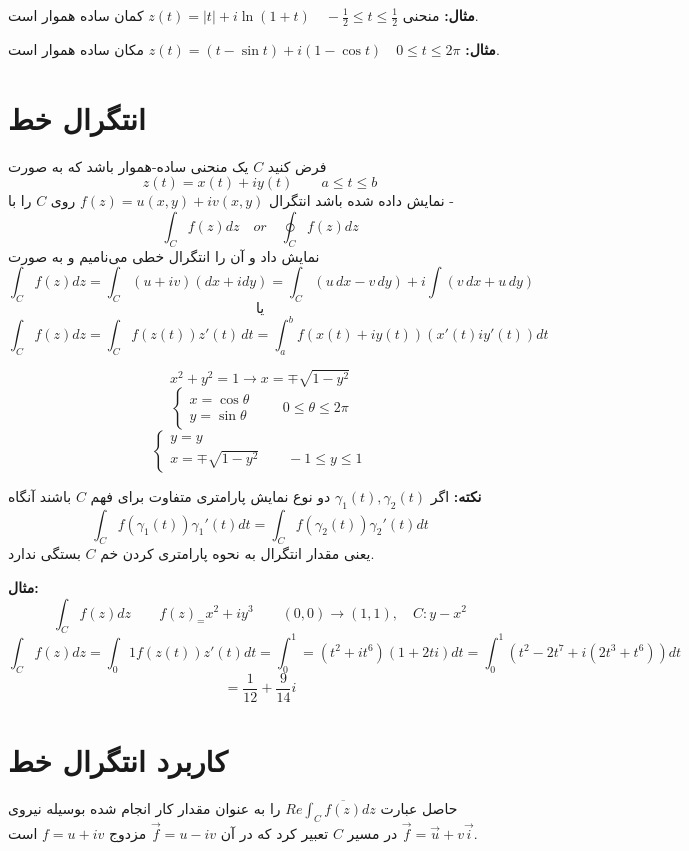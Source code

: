 \documentclass[12pt]{report}
\begin{document}
	 \textbf{مثال:}
	 منحنی
	 $z(t) = |t| + i \ln(1 + t) \quad  -\frac{1}{2} \leq t \leq \frac{1}{2}$
	 کمان ساده هموار است.
	 \newline
	 
	 \textbf{مثال:}
	 $z(t) = (t - \sin t) + i(1 - \cos t)\quad 0 \leq t \leq 2\pi$
	 مکان ساده هموار است.
	 \section{انتگرال خط}
	 فرض کنید 
	 $C$
	 یک منحنی ساده-هموار باشد که به صورت
	 $$z(t) = x(t) + i y(t) \qquad a \leq t \leq b$$
	 نمایش داده شده باشد انتگرال 
	 $f(z) = u(x, y) + i v(x, y)$
	 روی 
	 $C$
	 را با -
	 $$\int_{C} f(z) dz \quad or \quad \oint_{C} f(z) dz$$
	 نمایش داد و آن را انتگرال خطی می‌نامیم و به صورت 
	 $$\int_{C} f(z) dz = \int_{C} (u + iv)(dx + idy) = \int_{C}(u \, dx -v \, dy) + i\int (v \, dx + u \, dy)
	 $$
	 $$\text{یا}$$
	 $$\int_{C} f(z) dz = \int_{C} f(z(t)) z'(t) \, dt = \int_{a}^{b} f(x(t) + i y(t))(x'(t) i y'(t)) dt$$
	 
	 $$x^2 + y^2 = 1 \rightarrow x =\mp \sqrt{1 - y^2}$$
	 \[
	 \begin{cases}
	 	x = \cos \theta \\
	 	y = \sin \theta
	 \end{cases}
 \qquad 0 \leq \theta \leq 2\pi
	 \]
	 \[
	 \begin{cases}
	 	y = y \\
	 	x = \mp \sqrt{1 - y^2} \qquad -1 \leq y \leq 1
	 \end{cases}
	 \]
	 \newline
	 
	 \textbf{نکته:}
	 اگر 
	 $\gamma_1(t) , \gamma_2(t)$
	 دو نوع نمایش پارامتری متفاوت برای فهم 
	 $C$
	 باشند آنگاه
	 $$\int_{C} f(\gamma_1(t)) \gamma_1'(t) dt = \int_{C} f(\gamma_2(t)) \gamma_2'(t) dt$$ 
	 یعنی مقدار انتگرال به نحوه پارامتری کردن خم 
	 $C$
	 بستگی ندارد.
	 \newline
	 
	 \textbf{مثال:}
	 $$\int_{C} f(z) dz \qquad f(z)_ = x^2 + iy^3 \qquad (0,0) \rightarrow (1, 1), \quad C: y - x^2$$
	 $$\int_{C} f(z) dz = \int_{0}{1} f(z(t)) z'(t) dt = \int_{0}^{1} = (t^2 + it^6)(1 + 2ti)dt = \int_{0}^{1} (t^2 - 2t^7 + i(2t^3 + t^6))dt$$
	 $$=\frac{1}{12} + \frac{9}{14}i$$
	 
	 \section{کاربرد انتگرال خط}
	 حاصل عبارت
	 $Re \int_{C} \overline{f(z)} dz$
	 را به عنوان مقدار کار انجام شده بوسیله نیروی
	 $\vec{f} = \vec{u} + v \vec{i}$
	 در مسیر 
	 $C$
	 تعبیر کرد که در آن 
	 $\vec{f} = u - iv$
	 مزدوج
	 $f = u + iv$
	است.
	\newline
	
\end{document}
